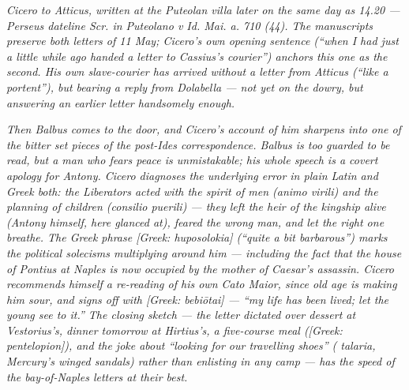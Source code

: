 
\textit{Cicero to Atticus, written at the Puteolan villa later
on the same day as 14.20 --- Perseus dateline \textit{Scr. in
Puteolano v Id. Mai. a. 710 (44)}. The manuscripts preserve
both letters of 11 May; Cicero's own opening sentence
(``when I had just a little while ago handed a letter to
Cassius's courier'') anchors this one as the second. His own
slave-courier has arrived without a letter from Atticus
(``like a portent''), but bearing a reply from Dolabella ---
not yet on the dowry, but answering an earlier letter handsomely
enough.}

\textit{Then Balbus comes to the door, and Cicero's account
of him sharpens into one of the bitter set pieces of the
post-Ides correspondence. Balbus is too guarded to be read,
but a man who fears peace is unmistakable; his whole speech
is a covert apology for Antony. Cicero diagnoses the
underlying error in plain Latin and Greek both: the
Liberators acted with the spirit of men (\textit{animo
virili}) and the planning of children (\textit{consilio
puerili}) --- they left the heir of the kingship alive (Antony
himself, here glanced at), feared the wrong man, and let the
right one breathe. The Greek phrase \textit{[Greek:
huposolokia]} (``quite a bit barbarous'') marks the
political solecisms multiplying around him --- including the
fact that the house of Pontius at Naples is now occupied by
the mother of Caesar's assassin. Cicero recommends himself a
re-reading of his own \textit{Cato Maior}, since old age is
making him sour, and signs off with \textit{[Greek:
bebi\=otai]} --- ``my life has been lived; let the young see
to it.'' The closing sketch --- the letter dictated over
dessert at Vestorius's, dinner tomorrow at Hirtius's, a
five-course meal (\textit{[Greek: pentelopion]}), and the
joke about ``looking for our travelling shoes'' (\textit{
talaria}, Mercury's winged sandals) rather than enlisting in
any camp --- has the speed of the bay-of-Naples letters at
their best.}

